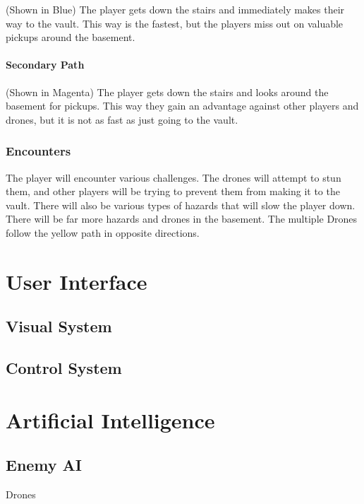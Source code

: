 \documentclass[14pt]{report}
\begin{document}
(Shown in Blue) The player gets down the stairs and immediately makes their way to the vault. This way is the fastest, but the players miss out on valuable pickups around the basement.

\subsubsection{Secondary Path}

(Shown in Magenta) The player gets down the stairs and looks around the basement for pickups. This way they gain an advantage against other players and drones, but it is not as fast as just going to the vault.


\subsection{Encounters}

The player will encounter various challenges. The drones will attempt to stun them, and other players will be trying to prevent them from making it to the vault. There will also be various types of hazards that will slow the player down. There will be far more hazards and drones in the basement. The multiple Drones follow the yellow path in opposite directions.


\chapter{User Interface}


\section{Visual System}
\section{Control System}

\chapter{Artificial Intelligence}
\section{Enemy AI}

Drones
\end{document}
